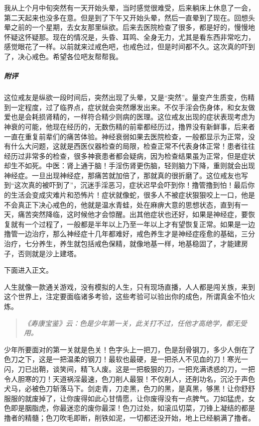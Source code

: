 \begin{case}
    我从上个月中旬突然有一天开始头晕，当时感觉很难受，后来躺床上休息了一会，第二天起来也没多在意。但是到了下午又开始头晕，然后一直晕到了现在。回想头晕之前的一个星期，去女友那里纵欲。后来去医院检查了很多，都是好的，慢慢地怀疑这怀疑那。现在的情况是，头昏、耳鸣、全身无力，尤其是看东西非常吃力，感觉眼花了一样。以前就来过戒色吧，也戒色过，但是时间都不久。这次真的吓到了，决心戒色。希望各位吧友帮帮我。
    \subparagraph{附评} 这位戒友是纵欲一段时间后，突然出现了头晕，又是“突然”。量变产生质变，伤精到一定程度，过了临界点，症状就会突然爆发出来。不仅手淫会伤身体，和女友做爱也是会耗损肾精的，一样符合精少则病的医理。这位戒友出现的症状表现考虑为神衰的可能，他现在经历的，无数伤精的前辈都经历过，撸界没有新鲜事，后来者一直在重复前辈们的痛苦体验。神经衰弱如果去医院检查，一般都显示为正常，没有什么大问题，这就是西医仪器检查的局限，检查正常不代表身体正常！患者往往经历过非常多的检查，很多神衰患者都会疑病，因为检查结果虽为正常，但是症状却生不如死。中医：肾上通于脑！手淫伤肾更伤脑，轻则脑力下降，重则就会出现神经症。一旦出现神经症，那痛苦就加倍了，那就真的很折磨了。这位戒友也写到“这次真的被吓到了”，沉迷手淫恶习，症状迟早会吓到你！撸管撸到怕！最后你的生活会变成灾难片和恐怖片！症状就像蛇，很多人不被症状狠狠咬上一口，他是不会真正下决心戒色的，他就是温水青蛙，处在麻痹大意的思想状态，直到有一天，痛苦突然降临，这时候他才会惊醒。出其他症状也还好，如果是神经症，要恢复就有一个过程了，一般都是半年以上乃至一年以上才有望恢复正常。如果是一边撸管一边治疗，那么神经症十几年都难好，戒色养生才是神经症痊愈的基础，三分治疗，七分养生，养生就包括戒色保精，就像地基一样，地基稳固了，才能建房子，否则就是沙上建塔。
\end{case}

下面进入正文。

人生就像一款通关游戏，没有模拟的人生，只有现场直播，人人都是闯关族，来到这个世界上，注定要面临诸多考验，这些考验可以验出你的成色，所谓真金不怕火炼。

\begin{quote}\it
    《寿康宝鉴》云：色是少年第一关，此关打不过，任他才高绝学，都无受用。
\end{quote}

少年所要面对的第一关就是色关！色字头上一把刀，色是刮骨钢刀，多少人倒在了色刀之下，这是一把温柔的钢刀！最软也最硬，是一把杀人不见血的刀！寒光一闪，刀已出鞘，谈笑间，精飞人废。这是一把极狠的刀，一把充满诱惑的刀，一把令人胆寒的刀！天道祸淫最速，色刀削人最狠！不仅削人，还削功名，沉沦于声色犬马，必被色刀斩落马下。剑走青，刀走黑，色刀的黑，是真黑，够黑！让你舒舒服服的就废掉了，让你废得如此心甘情愿，让你废得没有一点脾气。刀如猛虎，女色即是胭脂虎，你最迷恋的废你最深！色刀过处，如滚瓜切菜，刀锋上凝结的都是撸者的精髓；色刀吹毛即断，削铁如泥，一切都还没开始，地上已经躺满了撸者。

